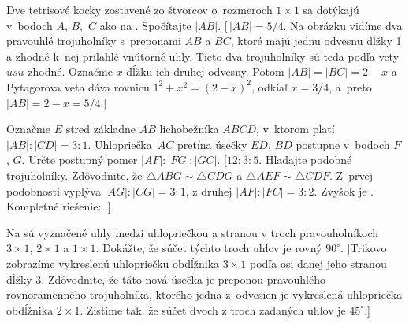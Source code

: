{\D
Dve tetrisové kocky zostavené zo štvorcov
o~rozmeroch $1\times1$ sa dotýkajú v~bodoch $A$, $B$,~$C$ ako na
\obr{}. Spočítajte $|AB|$.
%
[\,$|AB|=5/4$. Na obrázku vidíme dva pravouhlé trojuholníky
s~preponami $AB$ a $BC$, ktoré majú jednu odvesnu dĺžky 1 a
zhodné k~nej priľahlé vnútorné uhly. Tieto dva trojuholníky sú teda
podľa vety $usu$ zhodné. Označme $x$ dĺžku ich
druhej odvesny. Potom $|AB|=|BC|=2-x$ a Pytagorova veta
dáva rovnicu $1^2+x^2=(2-x)^2$, odkiaľ $x=3/4$, a~preto
$|AB|=2-x=5/4$.]

Označme $E$ stred základne $AB$ lichobežníka $ABCD$, v~ktorom platí
$|AB|:|CD|={3:1}$. Uhlopriečka~$AC$ pretína úsečky $ED$, $BD$ postupne
v~bodoch $F$, $ G$. Určte postupný pomer
$|AF|:|FG|:|GC|$.
[$12:3:5$. Hľadajte podobné trojuholníky. Zdôvodnite, že
$\triangle ABG \sim \triangle CDG$ a $\triangle AEF \sim
\triangle CDF$. Z~prvej podobnosti vyplýva $|AG|:|CG|=3:1$,
z druhej $|AF|:|FC|=3:2$. Zvyšok je . Kompletné riešenie: .]

Na \obr{} sú vyznačené uhly medzi uhlopriečkou a stranou
v troch pravouholníkoch $3\times1$, $2\times1$ a $1\times1$.
Dokážte, že súčet týchto troch uhlov je rovný $90^\circ$.
%
[Trikovo zobrazíme vykreslenú uhlopriečku obdĺžnika $3\times1$ podľa
osi danej jeho  stranou dĺžky 3. Zdôvodnite, že
táto nová úsečka je preponou pravouhlého rovnoramenného
trojuholníka, ktorého jedna z~odvesien je vykreslená uhlopriečka
obdĺžnika $2\times1$. Zistíme tak, že súčet dvoch z troch
zadaných uhlov je $45^\circ$.]

}

